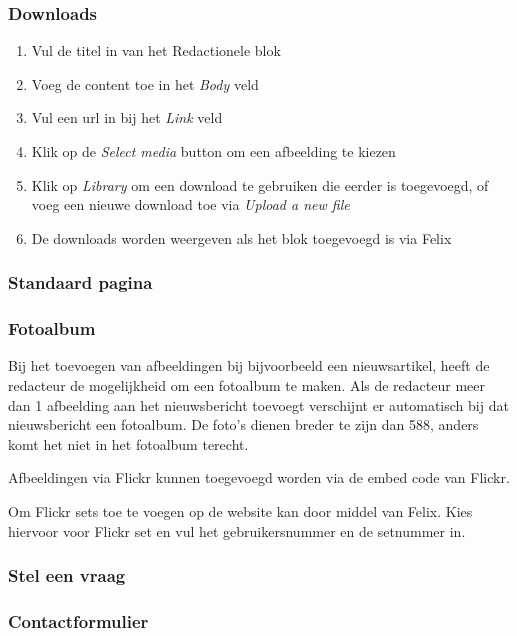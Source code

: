 \subsubsection{Downloads}
\begin{enumerate}
\item Vul de titel in van het Redactionele blok
\item Voeg de content toe in het \emph{Body} veld
\item Vul een url in bij het \emph{Link} veld
\item Klik op de \emph{Select media} button om een afbeelding te kiezen
\item Klik op \emph{Library} om een download te gebruiken die eerder is toegevoegd,  of voeg een nieuwe download toe via \emph{Upload a new file}
\item De downloads worden weergeven als het blok toegevoegd is via Felix
\end{enumerate}

\subsubsection{Standaard pagina}\label{pagenode}

\subsubsection{Fotoalbum}
Bij het toevoegen van afbeeldingen bij bijvoorbeeld een nieuwsartikel, heeft de redacteur de mogelijkheid om een fotoalbum te maken. Als de redacteur meer dan 1 afbeelding aan het nieuwsbericht toevoegt verschijnt er automatisch bij dat nieuwsbericht een fotoalbum. De foto's dienen breder te zijn dan 588, anders komt het niet in het fotoalbum terecht.

Afbeeldingen via Flickr kunnen toegevoegd worden via de embed code van Flickr.

Om Flickr sets toe te voegen op de website kan door middel van Felix. Kies hiervoor voor Flickr set en vul het gebruikersnummer en de setnummer in.

\subsubsection{Stel een vraag}

\subsubsection{Contactformulier}


